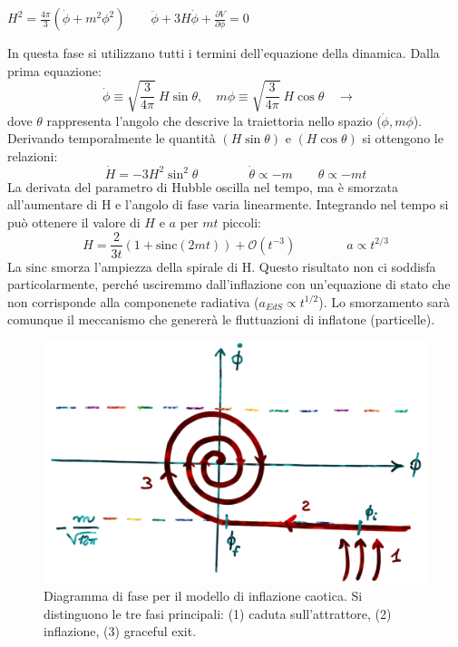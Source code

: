 \vspace{1em}
\begin{example} 
    $H^2=\frac{4\pi }{ 3} \left(\dot{\phi} +m^2\phi^2\right) \qquad \ddot{\phi} + 3H \dot{\phi} + \frac{\partial V}{\partial \phi} =0$
\end{example}
In questa fase si utilizzano tutti i termini dell'equazione della dinamica. Dalla prima equazione: 
\begin{equation}
    \dot{\phi} \equiv \sqrt{\frac{3}{4\pi}} ~H \sin \theta, \quad m\phi \equiv \sqrt{\frac{3}{4\pi }} ~H \cos \theta \quad \rightarrow \quad 
\end{equation}
dove $\theta$ rappresenta l'angolo che descrive la traiettoria nello spazio ($\dot{\phi}, m\phi$). Derivando temporalmente le quantità $(H\sin\theta)$ e $(H\cos\theta)$ si ottengono le relazioni:
\begin{equation}
    \dot{H} = -3H^2 \sin^2 \theta \qquad\qquad  \dot{\theta} \propto -m \qquad \theta \propto -mt
\end{equation}
La derivata del parametro di Hubble oscilla nel tempo, ma è smorzata all'aumentare di H e l'angolo di fase varia linearmente. Integrando nel tempo si può ottenere il valore di $H$ e $a$ per $mt$ piccoli:
\begin{equation}
    H = \frac{2}{3t}\left( 1+ \mathrm{sinc} (2mt)\right) + \mathcal{O}(t^{-3}) \qquad\qquad a\propto t^{2/3}
\end{equation}
La $\mathrm{sinc}$ smorza l'ampiezza della spirale di H. Questo risultato non ci soddisfa particolarmente, perché usciremmo dall'inflazione con un'equazione di stato che non corrisponde alla componenete radiativa ($a_{EdS}\propto t^{1/2}$). Lo smorzamento sarà comunque il meccanismo che genererà le fluttuazioni di inflatone (particelle).

\begin{figure}[H]
    \centering
    \includegraphics[width=.8 \textwidth]{Pictures/5/chaosinfl.png}
    \caption{Diagramma di fase per il modello di inflazione caotica. Si distinguono le tre fasi principali: (1) caduta sull'attrattore, (2) inflazione, (3) graceful exit.}
\end{figure}



